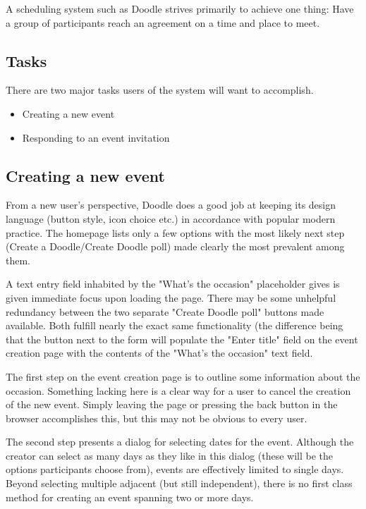 \documentclass{sigchi}
\begin{document}
A scheduling system such as Doodle strives primarily to achieve one
thing: Have a group of participants reach an agreement on a time and
place to meet.

\subsection{Tasks}

There are two major tasks users of the system will want
to accomplish.

\begin{itemize}
\item Creating a new event
\item Responding to an event invitation
\end{itemize}

\subsection{Creating a new event}

From a new user's perspective, Doodle does a good job at keeping its
design language (button style, icon choice etc.) in accordance with
popular modern practice. The homepage lists only a few options with
the most likely next step (Create a Doodle/Create Doodle poll) made
clearly the most prevalent among them.

A text entry field inhabited by the "What's the occasion"
placeholder gives is given immediate focus upon loading the
page. There may be some unhelpful redundancy between the two
separate "Create Doodle poll" buttons made available. Both fulfill
nearly the exact same functionality (the difference being that the
button next to the form will populate the "Enter title" field on the
event creation page with the contents of the "What's the occasion"
text field.


The first step on the event creation page is to outline some
information about the occasion. Something lacking here is a clear
way for a user to cancel the creation of the new event. Simply
leaving the page or pressing the back button in the browser
accomplishes this, but this may not be obvious to every user.

The second step presents a dialog for selecting dates for the
event. Although the creator can select as many days as they like in
this dialog (these will be the options participants choose from),
events are effectively limited to single days. Beyond selecting
multiple adjacent (but still independent), there is no first class
method for creating an event spanning two or more days. 
\end{document}
